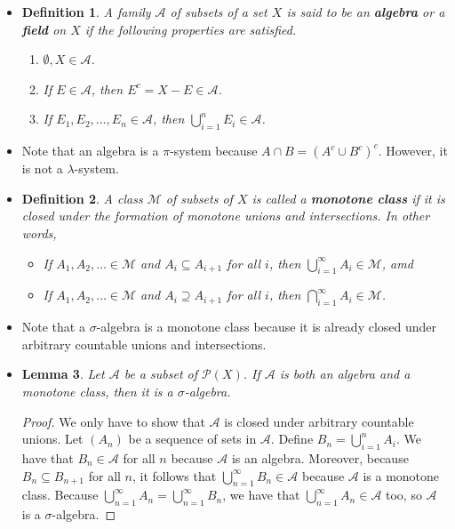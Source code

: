 \documentclass[10pt]{article}
\newtheorem{lemma}{Lemma}
\newtheorem{definition}[lemma]{Definition}
\newcommand{\mcal}[1]{\mathcal{#1}}
\begin{document}
\begin{itemize}
  \item \begin{definition}
    A family $\mcal{A}$ of subsets of a set $X$ is said to be an {\bf algebra} or a {\bf field} on $X$ if the following properties are satisfied.
    \begin{enumerate}
      \item $\emptyset, X \in \mcal{A}$.
      \item If $E \in \mcal{A}$, then $E^c = X-E \in \mcal{A}$.
      \item If $E_1, E_2, \dotsc, E_n \in \mcal{A}$, then $\bigcup_{i=1}^n E_i \in \mcal{A}$.
    \end{enumerate}
  \end{definition}  

  \item Note that an algebra is a $\pi$-system because $A \cap B = (A^c \cup B^c)^c$. However, it is not a $\lambda$-system.

  \item \begin{definition}
    A class $\mcal{M}$ of subsets of $X$ is called a {\bf monotone class} if it is closed under the  formation of monotone unions and intersections. In other words,
    \begin{itemize}
      \item If $A_1, A_2, \dotsc \in \mcal{M}$ and $A_i \subseteq A_{i+1}$ for all $i$, then $\bigcup_{i=1}^\infty A_i \in \mcal{M}$, amd
      \item If $A_1, A_2, \dotsc \in \mcal{M}$ and $A_i \supseteq A_{i+1}$ for all $i$, then $\bigcap_{i=1}^\infty A_i \in \mcal{M}$.
    \end{itemize}
  \end{definition}

  \item Note that a $\sigma$-algebra is a monotone class because it is already closed under arbitrary countable unions and intersections.  
  
  \item \begin{lemma} \label{lemma:monotone-algebra-is-sigma-algebra}
    Let $\mcal{A}$ be a subset of $\mcal{P}(X)$. If $\mcal{A}$ is both an algebra and a monotone class, then it is a $\sigma$-algebra.
  \end{lemma}

  \begin{proof}
    We only have to show that $\mcal{A}$ is closed under arbitrary countable unions. Let $(A_n)$ be a sequence of sets in $\mcal{A}$. Define $B_n = \bigcup_{i=1}^n A_i$. We have that $B_n \in \mcal{A}$ for all $n$ because $\mcal{A}$ is an algebra. Moreover, because $B_n \subseteq B_{n+1}$ for all $n$, it follows that $\bigcup_{n=1}^\infty B_n \in \mcal{A}$ because $\mcal{A}$ is a monotone class. Because $\bigcup_{n=1}^\infty A_n = \bigcup_{n=1}^\infty B_n$, we have that $\bigcup_{n=1}^\infty A_n \in \mcal{A}$ too, so $\mcal{A}$ is a $\sigma$-algebra.
  \end{proof}


\end{itemize}
\end{document}
